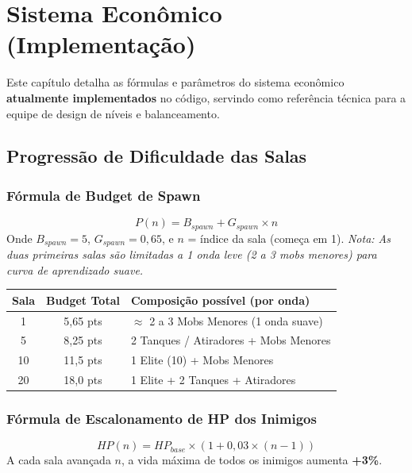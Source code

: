 \documentclass[a4paper,12pt]{report}
\begin{document}
\chapter{Sistema Econômico (Implementação)}\label{cap:economia}

Este capítulo detalha as fórmulas e parâmetros do sistema econômico \textbf{atualmente implementados} no código, servindo como referência técnica para a equipe de design de níveis e balanceamento.

\section{Progressão de Dificuldade das Salas}

\subsection{Fórmula de Budget de Spawn}
\[
P(n) = B_{spawn} + G_{spawn} \times n
\]
Onde $B_{spawn} = 5$, $G_{spawn} = 0{,}65$, e $n$ = índice da sala (começa em 1).
\textit{Nota: As duas primeiras salas são limitadas a 1 onda leve (2 a 3 mobs menores) para curva de aprendizado suave.}

\begin{center}
\begin{tabular}{|c|c|l|}
    \hline
    \textbf{Sala} & \textbf{Budget Total} & \textbf{Composição possível (por onda)} \\
    \hline
    1  & 5,65 pts & $\approx$ 2 a 3 Mobs Menores (1 onda suave) \\
    5  & 8,25 pts & 2 Tanques / Atiradores + Mobs Menores \\
    10 & 11,5 pts & 1 Elite (10) + Mobs Menores \\
    20 & 18,0 pts & 1 Elite + 2 Tanques + Atiradores \\
    \hline
\end{tabular}
\end{center}

\subsection{Fórmula de Escalonamento de HP dos Inimigos}
\[
HP(n) = HP_{base} \times (1 + 0{,}03 \times (n - 1))
\]
A cada sala avançada $n$, a vida máxima de todos os inimigos aumenta \textbf{+3\%}.
\end{document}
